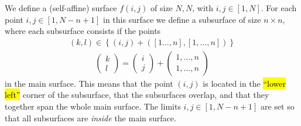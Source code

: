 We define a (self-affine) surface $f(i,j)$ of size $N,N$, with $i,j \in [1,N]$. For each point $i,j \in [1,N-n+1]$ in this surface we define a subsurface of size $n\times n$, where each subsurface consists if the points
\begin{align*}
    (k,l) \in \left\{ (i,j) + \left([1\dots,n], [1,\dots,n]\right)\right\}
\end{align*}
\begin{align*}
    \begin{pmatrix}
        k \\
        l
    \end{pmatrix}
    =
    \begin{pmatrix}
        i \\
        j
    \end{pmatrix}
    +
    \begin{pmatrix}
        1,\dots,n \\
        1,\dots,n
    \end{pmatrix}
\end{align*}%
%
in the main surface. This means that the point $(i,j)$ is located in the \hl{``lower left''} corner of the subsurface, that the subsurfaces overlap, and that they together span the whole main surface. The limits $i,j \in [1,N-n+1]$ are set so that all subsurfaces are \emph{inside} the main surface.

